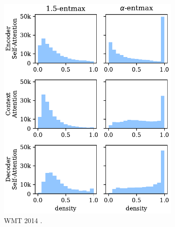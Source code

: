 \begin{figure}[!htbp]
    \begin{subfigure}[b]{.48\linewidth}
        \includegraphics[width=\linewidth]{Figures/hist_densities.pdf}
        \caption{%
            \label{fig:hist_densities_en}%
            WMT 2014 .}
    \end{subfigure}
    \begin{subfigure}[b]{.48\linewidth}

\end{subfigure}
\end{figure}
